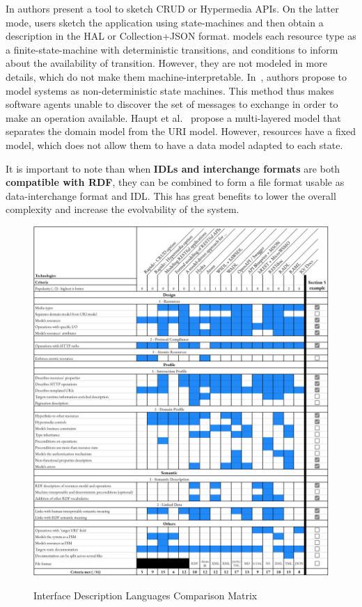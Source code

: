 In \cite{Rapido} authors present a tool to sketch CRUD or Hypermedia APIs. On the latter mode, users sketch the application using state-machines and then obtain a description in the HAL or Collection+JSON format.
\cite{Schreier:2011:MRA:1967428.1967434} models each resource type as a finite-state-machine with deterministic transitions, and conditions to inform about the availability of transition. However, they are not modeled in more details, which do not make them machine-interpretable.
In~\cite{10.1007/978-3-642-22233-7_24}, authors propose to model systems as non-deterministic state machines. This method thus makes software agents unable to discover the set of messages to exchange in order to make an operation available.
Haupt et al.~\cite{10.1109/ICWS.2014.30} propose a multi-layered model that separates the domain model from the URI model. However, resources have a fixed model, which does not allow them to have a data model adapted to each state.

It is important to note than when \textbf{IDLs and interchange formats} are both \textbf{compatible with RDF}, they can be combined to form a file format usable as data-interchange format and IDL. This has great benefits to lower the overall complexity and increase the evolvability of the system.

\begin{figure}[!ht]
\caption{Interface Description Languages Comparison Matrix}
\includegraphics[width=1\textwidth]{figures/IDL.png}
\label{idl-matrix}
\vspace{-1.2cm}
\end{figure}


